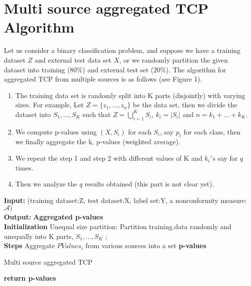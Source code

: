 \documentclass[main]{subfiles}
\begin{document}
\section{Multi source aggregated TCP Algorithm}
Let us consider a binary classification problem, and suppose we have a training dataset $Z$ and  external test data set $X$, or we randomly partition the given dataset into training ($80\%$) and external test set ($20\%$). The algorithm for aggregated TCP from multiple sources is as follows (see Figure 1).
\begin{enumerate}

\item The training data set is randomly split into K parts (disjointly) with varying sizes. For example, Let $Z = \{ z_1 , ..., z_n \} $ be the data set, then we divide the dataset into $S_1, ..., S_K$ such that $Z = \bigcup_{i=1}^K S_i$, $k_i = |S_i|$ and $n = k_1+ ...+k_K$.

\item We compute p-values using  $(X,S_i)$ for each $S_i$, say $p_i$ for each class, then we finally aggregate the k, p-values (weighted average).  

\item We repeat the step 1 and step 2 with different values of K and $k_i's$ say for $q$ times.

\item  Then we analyze the $q$ results obtained (this part is not clear yet).

\end{enumerate}


 \begin{algorithm}[H]
 \textbf{Input:}{ (training dataset:Z, test dataset:X, label set:Y, a nonconformity measure:$\mathcal{A})$}\\
 \textbf{Output:}{\textbf{ Aggregated p-values} }\\
 \textbf{Initialization\;}
 Unequal size partition: Partition training.data randomly and unequally into K parts, $S_1, ..., S_K$ ;\\ %
 \textbf{Steps\;}
 Aggregate $PValues_i$ from various sources into a set \textbf{p-values}
 \caption{Multi source aggregated TCP}
 \textbf{return \textbf{p-values}}
 \end{algorithm}
 
\end{document}
